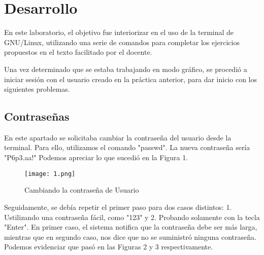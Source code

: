 \documentclass[
  letterpaper, 
  maincolor=black,
  sectioncolor=black!90,
  subsectioncolor=black!70,
  itemtextcolor=black!40,
]{fortysecondscv}
\begin{document}
\makefrontsidebar





\newpage
\section{Desarrollo}
{En este laboratorio, el objetivo fue interiorizar en el uso de la terminal de GNU/Linux, utilizando una serie de comandos para completar los ejercicios propuestos en el texto facilitado por el docente.}

{Una vez  determinado que se estaba trabajando en modo gráfico, se procedió a iniciar sesión con el usuario creado en la práctica anterior, para dar inicio con los siguientes problemas.}

\subsection{Contraseñas}

{En este apartado se solicitaba cambiar la contraseña del usuario desde la terminal. Para ello, utilizamos el comando "passwd". La nueva contraseña sería "P6p3.aa!" Podemos apreciar lo que sucedió en la Figura 1. }

\begin{center}
    \begin{figure}[H]
    \centering
    \texttt{[image: 1.png]}
    \caption{Cambiando la contraseña de Usuario}
    \label{fig:1.png}
    \end{figure}
\end{center}

{Seguidamente, se debía repetir el primer paso para dos casos distintos: 1. Ustilizando una contraseña fácil, como "123" y 2. Probando solamente con la tecla "Enter". En primer caso, el sistema notifica que la contraseña debe ser más larga, mientras que en segundo caso, nos dice que no se suministró ninguna contraseña. Podemos evidenciar que pasó en las Figuras 2 y 3 respectivamente.}
\end{document}
